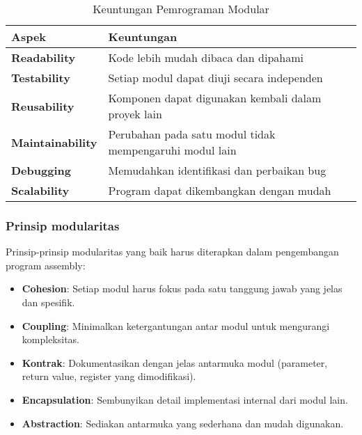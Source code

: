 \documentclass[../main.tex]{subfiles}
\begin{document}
            \begin{table}[H]
                \centering
                \caption{Keuntungan Pemrograman Modular}
                \begin{tabular}{|p{3cm}|p{8cm}|}
                    \hline
                    \textbf{Aspek} & \textbf{Keuntungan} \\
                    \hline
                    \textbf{Readability} & Kode lebih mudah dibaca dan dipahami \\
                    \hline
                    \textbf{Testability} & Setiap modul dapat diuji secara independen \\
                    \hline
                    \textbf{Reusability} & Komponen dapat digunakan kembali dalam proyek lain \\
                    \hline
                    \textbf{Maintainability} & Perubahan pada satu modul tidak mempengaruhi modul lain \\
                    \hline
                    \textbf{Debugging} & Memudahkan identifikasi dan perbaikan bug \\
                    \hline
                    \textbf{Scalability} & Program dapat dikembangkan dengan mudah \\
                    \hline
                \end{tabular}
                \label{tab:modular-benefits}
            \end{table}

        \subsubsection{Prinsip modularitas}
            Prinsip-prinsip modularitas yang baik harus diterapkan dalam pengembangan program assembly:

            \begin{itemize}
                \item \textbf{Cohesion}: Setiap modul harus fokus pada satu tanggung jawab yang jelas dan spesifik.
                \item \textbf{Coupling}: Minimalkan ketergantungan antar modul untuk mengurangi kompleksitas.
                \item \textbf{Kontrak}: Dokumentasikan dengan jelas antarmuka modul (parameter, return value, register yang dimodifikasi).
                \item \textbf{Encapsulation}: Sembunyikan detail implementasi internal dari modul lain.
                \item \textbf{Abstraction}: Sediakan antarmuka yang sederhana dan mudah digunakan.
            \end{itemize}
\end{document}
